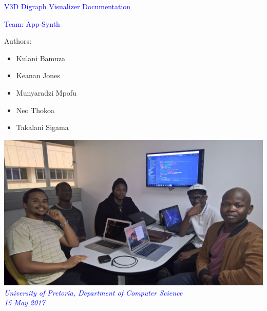 \documentclass[12pt]{article}
\begin{document}
\begin{titlepage}
\begin{center}
\begin{huge}
\begin{center}
\textcolor{blue}{V3D Digraph Visualizer Documentation}
\end{center}
\end{huge}
\hfill \break
\begin{Large}
\begin{center}
\textcolor{blue}{Team: App-Synth}
\end{center}
\end{Large}
\begin{small}
\begin{flushleft}
Authors:
\end{flushleft}

\begin{itemize}
	\item Kulani Bamuza \\
	\item Keanan Jones \\
	\item Munyaradzi Mpofu\\
	\item Neo Thokoa\\	
	\item Takalani Sigama\\
	
\end{itemize}
\end{small}

\end{center}
\begin{center}
\includegraphics[scale=0.4]{Dps/TeamPic.jpg}
\\
\textcolor{blue}{\textit{University of Pretoria, Department of Computer Science
\\
15 May 2017}}

\end{center}
\end{titlepage}
\end{document}
